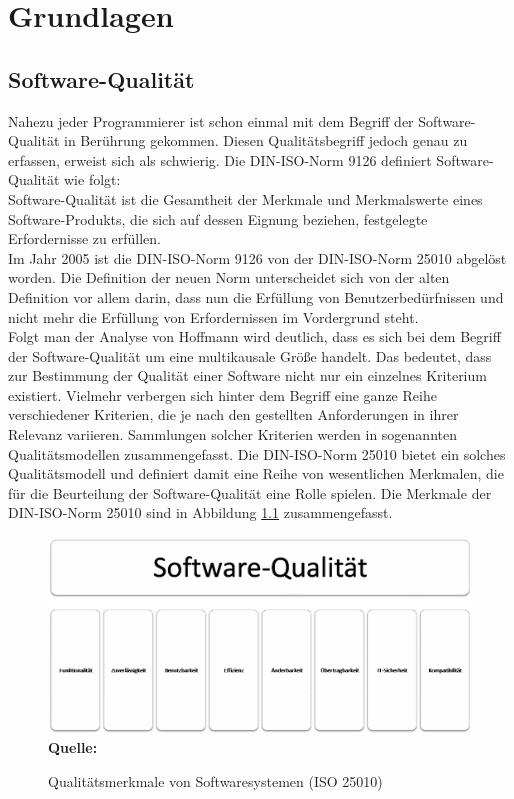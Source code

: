 \chapter{Grundlagen}
\label{sec:grundlagen}


\section{Software-Qualität}
\label{sec:softwarequalität}

Nahezu jeder Programmierer ist schon einmal mit dem Begriff der Software-Qualität in Berührung gekommen. Diesen Qualitätsbegriff jedoch genau zu erfassen, erweist sich als schwierig.
Die DIN-ISO-Norm 9126 definiert Software-Qualität wie folgt:
\\
\glqq Software-Qualität ist die Gesamtheit der Merkmale und Merkmalswerte eines Software-Produkts, die sich auf dessen Eignung beziehen, festgelegte Erfordernisse zu erfüllen.\grqq \cite{iso/iec_iso/iec_2001}
\\
Im Jahr 2005 ist die DIN-ISO-Norm 9126 von der DIN-ISO-Norm 25010 \cite{iso/iec_iso/iec_2011} abgelöst worden. Die Definition der neuen Norm unterscheidet sich von der alten Definition vor allem darin, dass nun die Erfüllung von Benutzerbedürfnissen und nicht mehr die Erfüllung von Erfordernissen im Vordergrund steht.\\
Folgt man der Analyse von Hoffmann \cite[vgl. S.6 ff.]{hoffmann_software-qualitat_2013} wird deutlich, dass es sich bei dem Begriff der Software-Qualität um eine multikausale Größe handelt. Das bedeutet, dass zur Bestimmung der Qualität einer Software nicht nur ein einzelnes Kriterium existiert. Vielmehr verbergen sich hinter dem Begriff eine ganze Reihe verschiedener Kriterien, die je nach den gestellten Anforderungen in ihrer Relevanz variieren.
Sammlungen solcher Kriterien werden in sogenannten Qualitätsmodellen zusammengefasst. Die DIN-ISO-Norm 25010 \cite{iso/iec_iso/iec_2011} bietet ein solches Qualitätsmodell und definiert damit eine Reihe von wesentlichen Merkmalen, die für die Beurteilung der Software-Qualität eine Rolle spielen. Die Merkmale der DIN-ISO-Norm 25010 \cite{iso/iec_iso/iec_2011} sind in Abbildung \ref{fig:qualitaetsmerkmaleVonSoftwaresystemen} zusammengefasst.
\begin{figure}[htb]
  \centering  
  \includegraphics[scale=0.7]{img/softwarequalitaet25010.png}\\
  \footnotesize\sffamily\textbf{Quelle:} \cite{iso/iec_iso/iec_2011}
  \caption{Qualitätsmerkmale von Softwaresystemen (ISO 25010)}
  \label{fig:qualitaetsmerkmaleVonSoftwaresystemen}
\end{figure}
